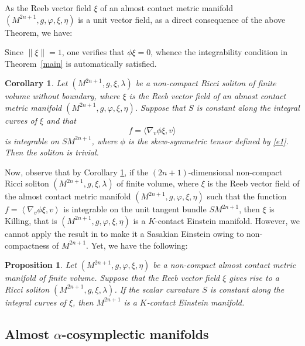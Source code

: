\documentclass[a4paper, twoside, 10pt]{article}
\numberwithin{equation}{section}
\newtheorem{corollary}{Corollary}[section]
\newtheorem{proposition}{Proposition}[section]
\theoremstyle{definition}
\begin{document}
As the Reeb vector field $\xi $ of an almost contact metric manifold  $
\left( M^{2n+1},g, \varphi ,\xi ,\eta \right) $ is a unit vector field, as a
direct consequence of the above Theorem, we have:

\medskip 
Since $\|\xi\|=1$, one verifies that $\phi\xi=0$, whence the
integrability condition in Theorem~\ref{main} is automatically
satisfied.

\begin{corollary}\label{c1}
Let $(M^{2n+1},g,\xi,\lambda)$ be a non-compact Ricci soliton of finite
volume without boundary, where $\xi$ is the Reeb vector field of an
almost contact metric manifold $(M^{2n+1},g,\varphi,\xi,\eta)$. Suppose
that $S$ is constant along the integral curves of $\xi$ and that
\[
f=\langle\nabla_v\phi\xi,v\rangle
\]
is integrable on $SM^{2n+1}$, where $\phi$ is the skew-symmetric tensor
defined by \eqref{e1}. Then the soliton is trivial.
\end{corollary}


Now, observe that by Corollary \ref{c1}, if the $(2n+1)$-dimensional non-compact
Ricci soliton $\left( M^{2n+1},g,\xi ,\lambda \right) $ of finite volume,
where $\xi $ is the Reeb vector field of the almost contact metric manifold $%
\left( M^{2n+1},g, \varphi ,\xi ,\eta \right) $ such that the function $%
f=\left\langle \nabla _{v} \phi \xi ,v\right\rangle $ is integrable on the
unit tangent bundle $SM^{2n+1}$, then $\xi $ is Killing, that is $\left(
M^{2n+1},g, \varphi ,\xi ,\eta \right) $ is a $K$-contact Einstein manifold.
However, we cannot apply the result in \cite{boyer2001einstein} to make it a Sasakian Einstein owing
to non-compactness of $M^{2n+1}$. Yet, we have the following:

\medskip 

\begin{proposition}\label{prop:kcontact}
Let $(M^{2n+1},g,\varphi,\xi,\eta)$ be a non-compact almost contact
metric manifold of finite volume. Suppose that the Reeb vector field $\xi$
gives rise to a Ricci soliton $(M^{2n+1},g,\xi,\lambda)$. If the scalar
curvature $S$ is constant along the integral curves of $\xi$, then
$M^{2n+1}$ is a $K$-contact Einstein manifold.
\end{proposition}


\subsection{Almost \texorpdfstring{$\alpha$}{alpha}-cosymplectic manifolds}
\end{document}
